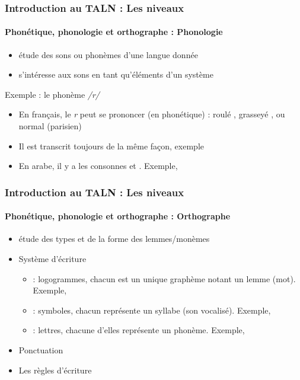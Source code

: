 \documentclass{beamer}
\begin{document}
\begin{frame}
\frametitle{Introduction au TALN : Les niveaux}
\framesubtitle{Phonétique, phonologie et orthographe : Phonologie}

\begin{itemize}
	\item étude des sons ou phonèmes d'une langue donnée
	\item s'intéresse aux sons en tant qu'éléments d'un système
\end{itemize}

\begin{exampleblock}{Exemple : le phonème \textit{/r/}}
	\begin{itemize}
		\item En français, le \textit{r} peut se prononcer (en phonétique) : roulé , grasseyé , ou normal (parisien) 
		\item Il est transcrit toujours de la même façon, exemple 
		\item En arabe, il y a les consonnes  et . 
		Exemple, 
	\end{itemize}
\end{exampleblock}

\end{frame}

\begin{frame}
\frametitle{Introduction au TALN : Les niveaux}
\framesubtitle{Phonétique, phonologie et orthographe : Orthographe}

\begin{itemize}
	\item étude des types et de la forme des lemmes/monèmes 
	\item Système d'écriture
	\begin{itemize}
		\item {} : logogrammes, chacun est un unique graphème notant un lemme (mot).
		Exemple, 
		\item {} : symboles, chacun représente un syllabe (son vocalisé). 
		Exemple, 
		\item {} : lettres, chacune d'elles représente un phonème. 
		Exemple, 
	\end{itemize}
	\item Ponctuation 
	\item Les règles d'écriture 
\end{itemize}

\end{frame}
\end{document}
